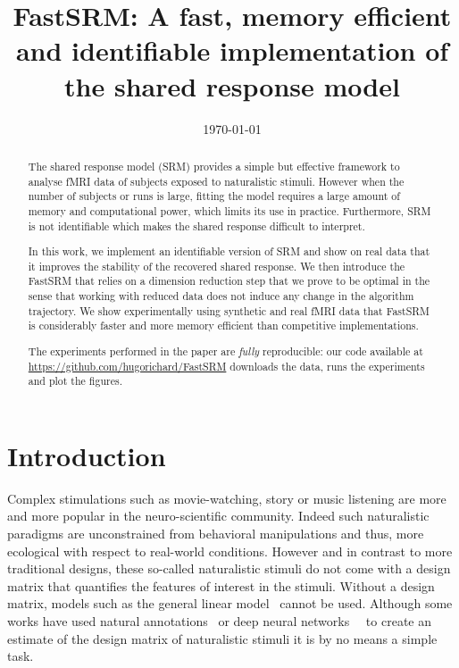 \documentclass{article}
\title{FastSRM: A fast, memory efficient and identifiable implementation of the
  shared response model}
\date{\today} %
\newcommand{\bt}[1]{\todo[color=orange, inline=True]{BT: #1}}
\begin{document}
\maketitle

\begin{abstract}
  The shared response model (SRM) provides a simple but effective framework to analyse
  fMRI data of subjects exposed to naturalistic stimuli.
  However when the number
  of subjects or runs is large,
  fitting the model requires a large amount of memory
and computational power, which limits its use in practice.
%
Furthermore, SRM is
not identifiable which makes the shared response difficult to interpret.


In this work, we implement an identifiable version of SRM and show on real data
that it improves the stability of the recovered shared response.
%
We then introduce the FastSRM that relies on a dimension reduction step that we
prove to be optimal in the sense that working with reduced data does not induce any change in the
algorithm trajectory.
%
We show experimentally using synthetic and real fMRI data
that FastSRM is considerably faster and more memory efficient
than competitive implementations.


The experiments performed in the paper are \emph{fully} reproducible: our
code available at \url{https://github.com/hugorichard/FastSRM} downloads the
data, runs the experiments and plot the figures.
%

\end{abstract}

\section{Introduction}
%
Complex stimulations such as movie-watching, story or music listening are more
and more popular in the neuro-scientific community. Indeed such naturalistic
paradigms are unconstrained from behavioral manipulations and thus, more
ecological with respect to real-world conditions.
%
However and in contrast to more traditional designs, these so-called
naturalistic stimuli do not come with a design matrix that quantifies the
features of interest in the stimuli.
%
Without a design matrix, models such as the general linear
model~\cite{poline2012general} cannot be used. Although some works have used
natural annotations~\cite{huth2012continuous} or deep neural
networks~\cite{gucclu2017increasingly}~\cite{richard2018optimizing} to create an
estimate of the design matrix of naturalistic
stimuli it is by no means a simple task.
\end{document}
